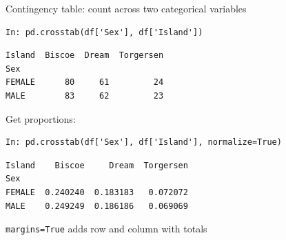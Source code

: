 \documentclass[aspectratio=169,usenames,dvipsnames]{beamer}
\begin{document}
\begin{frame}[fragile]{Contingency table: count across two categorical variables}
\begin{lstlisting}
In: pd.crosstab(df['Sex'], df['Island'])
\end{lstlisting}\vspace{-1em}\begin{lstlisting}[style=plain]
Island  Biscoe  Dream  Torgersen
Sex                             
FEMALE      80     61         24
MALE        83     62         23
\end{lstlisting}

\pause
Get proportions:
\begin{lstlisting}
In: pd.crosstab(df['Sex'], df['Island'], normalize=True)
\end{lstlisting}\vspace{-1em}\begin{lstlisting}[style=plain]
Island    Biscoe     Dream  Torgersen
Sex                                  
FEMALE  0.240240  0.183183   0.072072
MALE    0.249249  0.186186   0.069069
\end{lstlisting}

    \lstinline{margins=True} adds row and column with totals
\end{frame}

\end{document}
